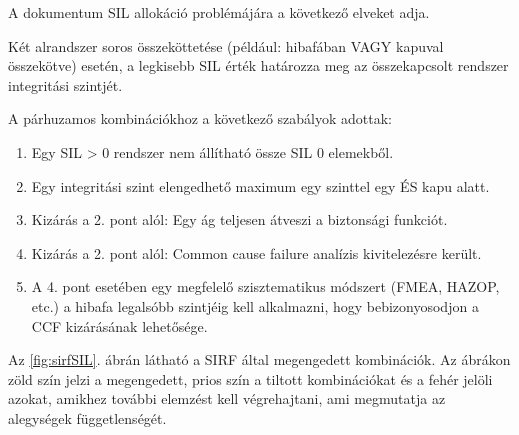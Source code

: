 A dokumentum SIL allokáció problémájára a következő elveket adja.

Két alrandszer soros összeköttetése (például: hibafában VAGY kapuval összekötve) esetén, a legkisebb SIL érték határozza meg az összekapcsolt rendszer integritási szintjét.

A párhuzamos kombinációkhoz a következő szabályok adottak:
\begin{enumerate}
	\item Egy SIL > 0 rendszer nem állítható össze SIL 0 elemekből.
	\item Egy integritási szint elengedhető maximum egy szinttel egy ÉS kapu alatt.
	\item Kizárás a 2. pont alól: Egy ág teljesen átveszi a biztonsági funkciót.
	\item Kizárás a 2. pont alól: Common cause failure analízis kivitelezésre került.
	\item A 4. pont esetében egy megfelelő szisztematikus módszert (FMEA, HAZOP, etc.) a hibafa legalsóbb szintjéig kell alkalmazni, hogy bebizonyosodjon a CCF kizárásának lehetősége.
\end{enumerate}
Az \ref{fig:sirfSIL}. ábrán látható a SIRF által megengedett kombinációk. 
Az ábrákon zöld szín jelzi a megengedett, prios szín a tiltott kombinációkat és a fehér jelöli azokat, amikhez további elemzést kell végrehajtani, ami megmutatja az alegységek függetlenségét.

